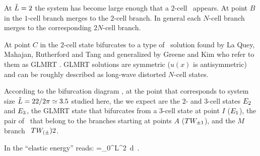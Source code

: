 At $\tilde{L}=2$ the system has become large enough 
that a $2$-cell \eqv\ appears. 
At point $B$ in 
the $1$-cell branch merges to the $2$-cell branch. 
In general each $N$-cell branch merges to the corresponding $2N$-cell branch.

At point $C$ in 
the $2$-cell state bifurcates to a type of 
\eqv\ solution
found by La Quey, Mahajan, Rutherford and Tang and generalized by Greene and Kim who refer to them as GLMRT \eqva. GLMRT solutions are symmetric 
($u(x)$ is antisymmetric)
and can be roughly described as long-wave distorted $N$-cell states.


According to the bifurcation diagram 
, 
at the point that corresponds to system size $\tilde{L}=22/2\pi \simeq 3.5$
studied here,
the {\eqva} we expect are the $2$- and $3$-cell states $E_{2}$ and $E_{3}$,
the GLMRT state that bifurcates from a $3$-cell state at point $I$ ($E_{1}$),
the pair of \reqva\ that belong to the branches starting at points $A$ ($TW_{\pm1}$),
and the $M$ branch  \reqva\ $TW_{(\pm}){2}$.


In  
the ``elastic energy'' reads:
\beq
    =\int_0^{L}^2\, d
    \,.
\label{ksEnergy}
\eeq




